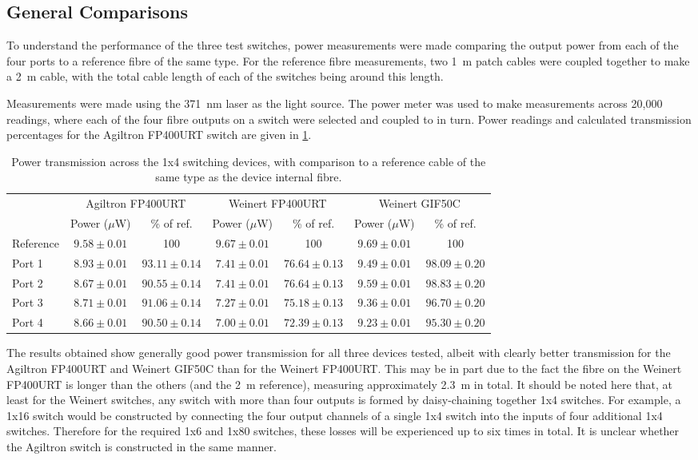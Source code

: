\documentclass[a4paper,11pt]{article}
\begin{document}
\subsection{General Comparisons}

To understand the performance of the three test switches, power measurements were made comparing the output power from each of the four ports to a reference fibre of the same type. For the reference fibre measurements, two 1~m patch cables were coupled together to make a 2~m cable, with the total cable length of each of the switches being around this length.

Measurements were made using the 371~nm laser as the light source. The power meter was used to make measurements across 20,000 readings, where each of the four fibre outputs on a switch were selected and coupled to in turn. Power readings and calculated transmission percentages for the Agiltron FP400URT switch are given in \cref{tab:switchpower}.
\begin{table}[h]
\centering
\begin{tabular}{l|cc|cc|cc}
\toprule
\multirow{2}{*}{} & \multicolumn{2}{c|}{Agiltron FP400URT} & \multicolumn{2}{c|}{Weinert FP400URT} & \multicolumn{2}{c}{Weinert GIF50C} \\
			&	Power ($\mu$W) & \% of ref. & Power ($\mu$W) & \% of ref. & Power ($\mu$W) & \% of ref.\\ \midrule
Reference	& $9.58\pm0.01$	& 100  			 & $9.67\pm0.01$ & 100 			  & $9.69\pm0.01$ & 100 \\
Port 1		& $8.93\pm0.01$	& $93.11\pm0.14$ & $7.41\pm0.01$ & $76.64\pm0.13$ & $9.49\pm0.01$ & $98.09\pm0.20$ \\
Port 2		& $8.67\pm0.01$	& $90.55\pm0.14$ & $7.41\pm0.01$ & $76.64\pm0.13$ & $9.59\pm0.01$ & $98.83\pm0.20$ \\
Port 3		& $8.71\pm0.01$	& $91.06\pm0.14$ & $7.27\pm0.01$ & $75.18\pm0.13$ & $9.36\pm0.01$ & $96.70\pm0.20$ \\
Port 4		& $8.66\pm0.01$	& $90.50\pm0.14$ & $7.00\pm0.01$ & $72.39\pm0.13$ & $9.23\pm0.01$ & $95.30\pm0.20$ \\
\bottomrule
\end{tabular}
\caption{Power transmission across the 1x4 switching devices, with comparison to a reference cable of the same type as the device internal fibre.}\label{tab:switchpower}
\end{table}
The results obtained show generally good power transmission for all three devices tested, albeit with clearly better transmission for the Agiltron FP400URT and Weinert GIF50C than for the Weinert FP400URT. This may be in part due to the fact the fibre on the Weinert FP400URT is longer than the others (and the 2~m reference), measuring approximately 2.3~m in total. It should be noted here that, at least for the Weinert switches, any switch with more than four outputs is formed by daisy-chaining together 1x4 switches. For example, a 1x16 switch would be constructed by connecting the four output channels of a single 1x4 switch into the inputs of four additional 1x4 switches. Therefore for the required 1x6 and 1x80 switches, these losses will be experienced up to six times in total. It is unclear whether the Agiltron switch is constructed in the same manner.
\end{document}
